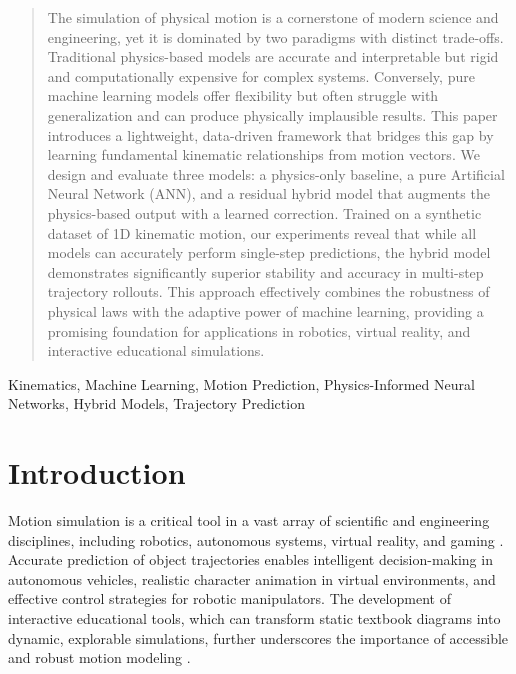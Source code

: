 \documentclass[conference]{IEEEtran}
\begin{document}
\maketitle

\begin{abstract}
The simulation of physical motion is a cornerstone of modern science and engineering, yet it is dominated by two paradigms with distinct trade-offs. Traditional physics-based models are accurate and interpretable but rigid and computationally expensive for complex systems. Conversely, pure machine learning models offer flexibility but often struggle with generalization and can produce physically implausible results. This paper introduces a lightweight, data-driven framework that bridges this gap by learning fundamental kinematic relationships from motion vectors. We design and evaluate three models: a physics-only baseline, a pure Artificial Neural Network (ANN), and a residual hybrid model that augments the physics-based output with a learned correction. Trained on a synthetic dataset of 1D kinematic motion, our experiments reveal that while all models can accurately perform single-step predictions, the hybrid model demonstrates significantly superior stability and accuracy in multi-step trajectory rollouts. This approach effectively combines the robustness of physical laws with the adaptive power of machine learning, providing a promising foundation for applications in robotics, virtual reality, and interactive educational simulations.
\end{abstract}

\begin{IEEEkeywords}
Kinematics, Machine Learning, Motion Prediction, Physics-Informed Neural Networks, Hybrid Models, Trajectory Prediction
\end{IEEEkeywords}

\section{Introduction}
Motion simulation is a critical tool in a vast array of scientific and engineering disciplines, including robotics, autonomous systems, virtual reality, and gaming \cite{b1}. Accurate prediction of object trajectories enables intelligent decision-making in autonomous vehicles, realistic character animation in virtual environments, and effective control strategies for robotic manipulators. The development of interactive educational tools, which can transform static textbook diagrams into dynamic, explorable simulations, further underscores the importance of accessible and robust motion modeling \cite{b2}.
\end{document}
